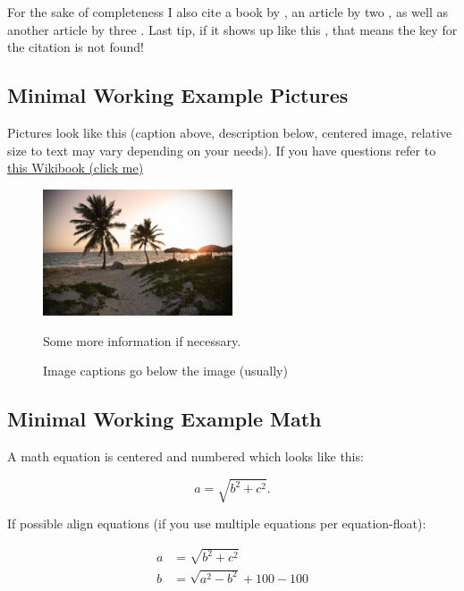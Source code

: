 \documentclass[12pt,a4paper]{article}
\begin{document}
For the sake of completeness I also cite a book by \textcite{Wilkinson2006}, an article by two \textcite{Modigliani1958}, as well as another article by three \textcite{Johnson2000}. Last tip, if it shows up like this \textcite{UnknownKey2000}, that means the key for the citation is not found!

\subsection{Minimal Working Example Pictures}
Pictures look like this (caption above, description below, centered image, relative size to text may vary depending on your needs). If you have questions refer to \href{https://en.wikibooks.org/wiki/LaTeX/Floats,_Figures_and_Captions}{this Wikibook (click me)}

\begin{figure}[h]
\centering
\includegraphics[width=0.5\textwidth]{pictures/beach.jpg} \\
\caption{Image captions go below the image (usually)}
\small Some more information if necessary.
\end{figure}

\subsection{Minimal Working Example Math}
\label{subsec:math}
A math equation is centered and numbered which looks like this:

\begin{equation}
a = \sqrt{b^2 + c^2}.
\end{equation}

If possible align equations (if you use multiple equations per equation-float):

\begin{equation}
\begin{split}
a &= \sqrt{b^2 + c^2}\\
b &= \sqrt{a^2 - b^2} + 100 - 100 
\end{split}
\end{equation}
\end{document}
